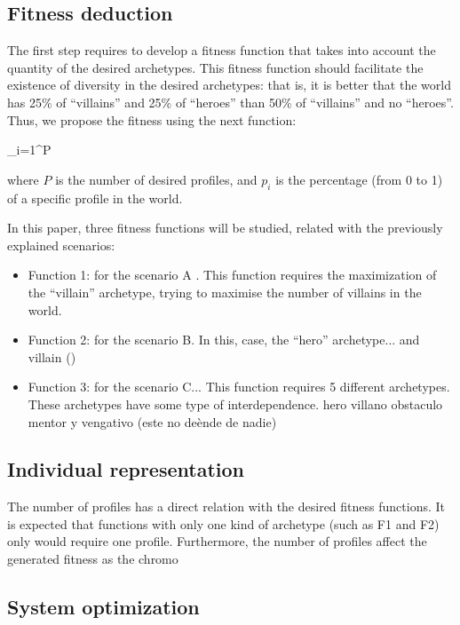 \documentclass[runningheads,a4paper]{llncs}
\begin{document}
\subsection{Fitness deduction}

The first step requires to develop a fitness function that takes into account the quantity of the desired archetypes. This fitness function should facilitate the existence of diversity in the desired archetypes: that is, it is better that the world has 25\% of ``villains'' and 25\% of ``heroes'' than 50\% of ``villains'' and no ``heroes''. Thus, we propose the fitness using the next function:

\sum _{i=1}^{P} {}

where $P$ is the number of desired profiles, and $p_{i}$ is the percentage (from 0 to 1) of a specific profile in the world.

In this paper, three fitness functions will be studied, related with the previously explained scenarios:
\begin{itemize}
\item Function 1: for the scenario A . This function requires the maximization of the ``villain'' archetype, trying to maximise the number of villains in the world. 
\item Function 2: for the scenario B. In this, case, the ``hero'' archetype... and villain ()
\item Function 3: for the scenario C... This function requires 5 different archetypes. These archetypes have some type of interdependence. hero villano obstaculo mentor y vengativo (este no deènde de nadie)
\end{itemize}

\subsection{Individual representation}

The number of profiles has a direct relation with the desired fitness functions. It is expected that functions with only one kind of archetype (such as F1 and F2) only would require one profile. Furthermore, the number of profiles affect the generated fitness as the chromo



\subsection{System optimization}
\end{document}
